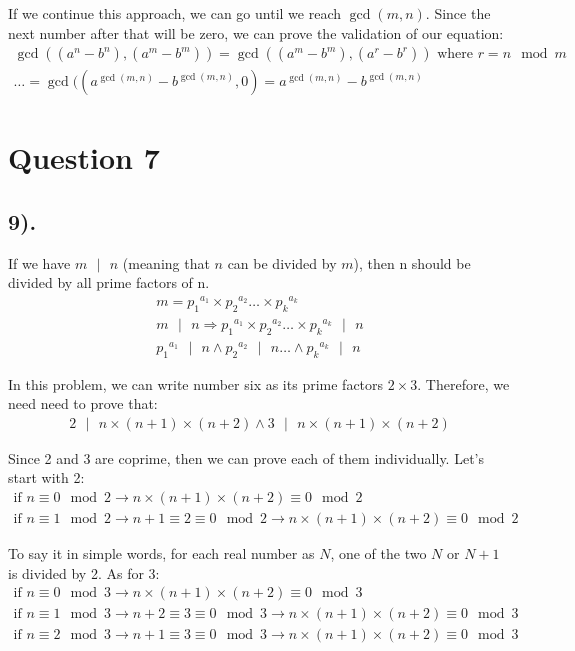 \documentclass[12pt]{article}
\begin{document}
If we continue this approach, we can go until we reach $\gcd(m,n)$. Since the next number after that will
be zero, we can prove the validation of our equation:
\begin{gather*}
    \gcd((a^n - b^n), (a^m - b^m)) = \gcd((a^m - b^m), (a^r - b^r)) \text{ where $r = n \mod m$} \\
    \ldots
    = \gcd((a^{\gcd(m,n)} - b^{\gcd(m,n)}, 0) = a^{\gcd(m,n)} - b^{\gcd(m,n)}
\end{gather*}

\section*{Question 7}
\subsection*{9).}
If we have $m\text{ $|$ }n$ (meaning that $n$ can be divided by $m$), then n should be divided by all prime factors of n.
\begin{gather*}
    m = {p_{1}}^{a_{1}} \times {p_{2}}^{a_{2}} \ldots \times {p_{k}}^{a_{k}} \\
    m \text{ $|$ } n \Rightarrow {p_{1}}^{a_{1}} \times {p_{2}}^{a_{2}} \ldots \times {p_{k}}^{a_{k}} \text{ $|$ } n \\
    {p_{1}}^{a_{1}} \text{ $|$ } n \wedge {p_{2}}^{a_{2}} \text{ $|$ } n \ldots \wedge {p_{k}}^{a_{k}} \text{ $|$ } n
\end{gather*}

In this problem, we can write number six as its prime factors $2 \times 3$. Therefore, we need need to prove that:
\begin{gather*}
    2 \text{ $|$ } n \times (n+1) \times (n+2) \wedge 3 \text{ $|$ } n \times (n+1) \times (n+2)
\end{gather*}

Since 2 and 3 are coprime, then we can prove each of them individually. Let's start with 2:
\begin{gather*}
    \text{if } n \equiv 0 \mod 2 \to n \times (n+1) \times (n+2) \equiv 0 \mod 2 \\
    \text{if } n \equiv 1 \mod 2 \to n+1 \equiv 2 \equiv 0 \mod 2 \to n \times (n+1) \times (n+2) \equiv 0 \mod 2
\end{gather*}

To say it in simple words, for each real number as $N$, one of the two $N$ or $N+1$ is divided by 2. As for 3:
\begin{gather*}
    \text{if } n \equiv 0 \mod 3 \to n \times (n+1) \times (n+2) \equiv 0 \mod 3 \\
    \text{if } n \equiv 1 \mod 3 \to n+2 \equiv 3 \equiv 0 \mod 3 \to n \times (n+1) \times (n+2) \equiv 0 \mod 3 \\
    \text{if } n \equiv 2 \mod 3 \to n+1 \equiv 3 \equiv 0 \mod 3 \to n \times (n+1) \times (n+2) \equiv 0 \mod 3
\end{gather*}
\end{document}
